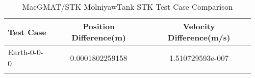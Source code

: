 \begin{table}[htbp!]
\centering
\caption{ MacGMAT/STK MolniyawTank STK Test Case Comparison}
      \begin{tabular}{lcc}
      \hline\hline
          Test Case & Position Difference(m) & Velocity Difference(m/s) \\
         \hline
         Earth-0-0-0 & 0.0001802259158 & 1.510729593e-007 \\
      \hline\hline
      \label{Table: MolniyawTank STK Table} 
\end{tabular}
\end{table}
